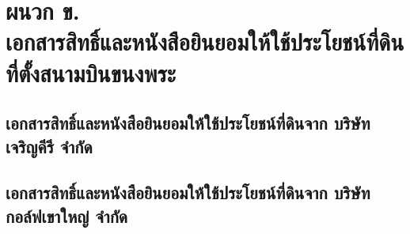 
\chapter{ผนวก ข. \\
		เอกสารสิทธิ์และหนังสือยินยอมให้ใช้ประโยชน์ที่ดินที่ตั้งสนามบินขนงพระ}
		
\section{เอกสารสิทธิ์และหนังสือยินยอมให้ใช้ประโยชน์ที่ดินจาก บริษัท เจริญคีรี จำกัด} \label{เอกสารสิทธิ์และหนังสือยินยอมให้ใช้ประโยชน์ที่ดินจาก บริษัท เจริญคีรี จำกัด}




\section{เอกสารสิทธิ์และหนังสือยินยอมให้ใช้ประโยชน์ที่ดินจาก บริษัท กอล์ฟเขาใหญ่ จำกัด} \label{เอกสารสิทธิ์และหนังสือยินยอมให้ใช้ประโยชน์ที่ดินจาก บริษัท กอล์ฟเขาใหญ่ จำกัด}

